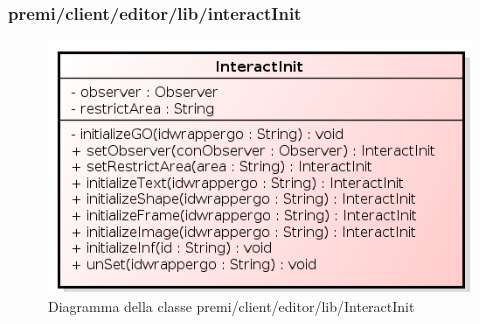 \subsubsection{premi/client/editor/lib/interactInit}
\begin{figure}[H]
\begin{center}
\includegraphics[scale=0.90]{img/diacla/InteractInit.png}
\caption{Diagramma della classe premi/client/editor/lib/InteractInit}
\end{center}
\end{figure}


